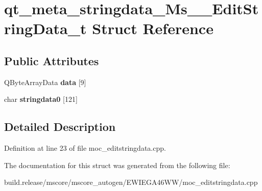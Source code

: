 \hypertarget{structqt__meta__stringdata___ms_____edit_string_data__t}{}\section{qt\+\_\+meta\+\_\+stringdata\+\_\+\+Ms\+\_\+\+\_\+\+Edit\+String\+Data\+\_\+t Struct Reference}
\label{structqt__meta__stringdata___ms_____edit_string_data__t}
\subsection*{Public Attributes}
\begin{DoxyCompactItemize}
\item 
\mbox{\label{structqt__meta__stringdata___ms_____edit_string_data__t_a9f45dadef07a7af58aaa8f40decef8a7}} 
Q\+Byte\+Array\+Data {\bfseries data} \mbox{[}9\mbox{]}
\item 
\mbox{\label{structqt__meta__stringdata___ms_____edit_string_data__t_a674ee7b4585963886b7db517fd961c36}} 
char {\bfseries stringdata0} \mbox{[}121\mbox{]}
\end{DoxyCompactItemize}


\subsection{Detailed Description}


Definition at line 23 of file moc\+\_\+editstringdata.\+cpp.



The documentation for this struct was generated from the following file\+:\begin{DoxyCompactItemize}
\item 
build.\+release/mscore/mscore\+\_\+autogen/\+E\+W\+I\+E\+G\+A46\+W\+W/moc\+\_\+editstringdata.\+cpp\end{DoxyCompactItemize}
